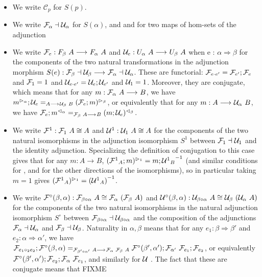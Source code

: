 \documentclass{drl-common/llncs}
\newcommand{\inv}[1]{\ensuremath{{#1}^{-1}}}
\newcommand{\C}{\ensuremath{\mathcal{C}}}
\newcommand{\la}{\ensuremath{\dashv}}
\newcommand{\arrow}[3]{\ensuremath{#2 \longrightarrow_{#1} #3}}
\newcommand{\tc}[2]{\ensuremath{#1 \Rightarrow #2}}
\newcommand\compo[2]{\ensuremath{#1 \circ #2}}
\newcommand\compv[2]{\ensuremath{#1 \cdot #2}}
\newcommand\comph[2]{\ensuremath{#1 \mathbin{\circ_2} #2}}
\newcommand\F[2]{\ensuremath{F_{#1} \,\, #2}}
\newcommand\U[2]{\ensuremath{U_{#1} \,\, #2}}
\begin{document}
\begin{itemize}
\item We write $\C_p$ for $S(p)$.

\item We write $\semFo{\alpha}{} \la \semUo{\alpha}$ for $S(\alpha)$, and
  \semltor{-}{\alpha} and \semrtol{-}{\alpha} for two maps of hom-sets of the adjunction

\item We write $\semFo{e} : \arrow{}{\F \beta A}{\F \alpha A}$
and $\semUo{e} : \arrow{}{\U \alpha A}{\U \beta A}$
 when {e : \tc{\alpha}{\beta}}
for the components of the two natural transformations in the adjunction 
morphism $S(e) : \arrow{}{\semFo{\beta}{} \la \semUo{\beta}} {\semFo{\alpha}{} \la \semUo{\alpha}}$.  
These are functorial: $\semFo{\compv{e}{e'}} = \semFo{e'};\semFo{e}$
and ${\mathcal{F}_{1}} = 1$ and 
$\semUo{\compv{e}{e'}} = \semUo{e};\semUo{e'}$
and $\mathcal{U}_{1} = 1$.  Moreover, they are conjugate, which means 
that for any $m : \arrow{}{\semF{\alpha}{A}}{B}$, we have
$\semltor{m}{\alpha};\semUo{e} =_{\arrow{}{A}{\semU{\beta}{B}}} \semltor{(\semFo{e};m)}{\beta}$,
or equivalently that 
for any $m : \arrow{}{{A}}{\semU{\alpha} B}$, we have
$\semFo{e};\semrtol{m}{\alpha} =_{\arrow{}{\semF \beta A}{B}} \semrtol{(m;\semUo{e})}{\beta}$.

\item We write ${\mathcal{F}^1} : \mathcal{F}_{1} \,\, A \cong A$ and ${\mathcal{U}^1} :
  \mathcal{U}_{1} \,\, A \cong A$ for the components of the two natural isomorphisms
  in the adjunction isomorphism $S^1$ between $\semFo{1}{} \la
  \semUo{1}$ and the identity adjunction.  Specializing the definition
  of conjugation to this case gives that for any $m : \arrow{}{A}{B}$,
  $\ltor{(\semFone_A;m)}{1} = m;\inv{\semUone_B}$ (and similar
  conditions for \rtol{-}{}, and for the other directions of the
  isomorphisms), so in particular taking $m = 1$ gives
  $\ltor{(\semFone_A)}{{1}} = \inv{(\semUone_A)}$.

\item We write $\semFcomp(\beta,\alpha) : \semF{\compo{\beta}{\alpha}}{A} \iso
  \semF{\alpha}{(\semF \beta A)}$ and $\semUcomp(\beta,\alpha) :
  \semU{\compo{\beta}{\alpha}}{A} \iso \semU{\beta}{(\semU{\alpha}{A})}$
  for the components of the two natural isomorphisms in the 
  natural adjunction isomorphism $S^\circ$ between $\semFo{\compo{\beta}{\alpha}}
  \la \semUo{\compo{\beta}{\alpha}}$ and the composition of the
  adjunctions $\semFo{\alpha} \la \semUo{\alpha}$ and
  $\semFo{\beta} \la \semUo{\beta}$.  
  Naturality in $\alpha,\beta$ means that 
  for any 
  $e_1 : \tc{\beta}{\beta'}$ and $e_2 : \tc{\alpha}{\alpha'}$, 
  we have
  $ \semFo{\comph{e_1}{e_2}};\semFcomp(\beta,\alpha) =_{\arrow{}{\semF{\compo{\beta'}{\alpha'}}{A}}{\semF{\alpha}{\semF{\beta}{A}}}}
  \semFcomp(\beta',\alpha');\semF{\alpha'}{\semFo{e_1}};{\semFo{e_2}}$,
  or equivalently 
  $\mathcal{F}^\circ(\beta',\alpha');{{\mathcal{F}_{e_2}}};\mathcal{F}_{\alpha} \,\, {\mathcal{F}_{e_1}}$,
  and similarly for $\mathcal{U}_{} \,\, $.
  The fact that these are conjugate
  means that FIXME


\end{itemize}
\end{document}
